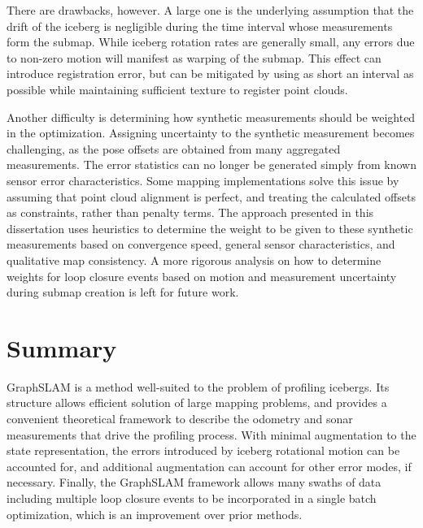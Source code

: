 There are drawbacks, however. A large one is the underlying assumption that the drift of the iceberg is negligible during the time interval whose measurements form the submap. While iceberg rotation rates are generally small, any errors due to non-zero motion will manifest as warping of the submap. This effect can introduce registration error, but can be mitigated by using as short an interval as possible while maintaining sufficient texture to register point clouds.

Another difficulty is determining how synthetic measurements should be weighted in the optimization. Assigning uncertainty to the synthetic measurement becomes challenging, as the pose offsets are obtained from many aggregated measurements. The error statistics can no longer be generated simply from known sensor error characteristics. Some mapping implementations solve this issue by assuming that point cloud alignment is perfect, and treating the calculated offsets as constraints, rather than penalty terms. The approach presented in this dissertation uses heuristics to determine the weight to be given to these synthetic measurements based on convergence speed, general sensor characteristics, and qualitative map consistency. A more rigorous analysis on how to determine weights for loop closure events based on motion and measurement uncertainty during submap creation is left for future work.


\section{Summary}

GraphSLAM is a method well-suited to the problem of profiling icebergs. Its structure allows efficient solution of large mapping problems, and provides a convenient theoretical framework to describe the odometry and sonar measurements that drive the profiling process. With minimal augmentation to the state representation, the errors introduced by iceberg rotational motion can be accounted for, and additional augmentation can account for other error modes, if necessary. Finally, the GraphSLAM framework allows many swaths of data including multiple loop closure events to be incorporated in a single batch optimization, which is an improvement over prior methods.